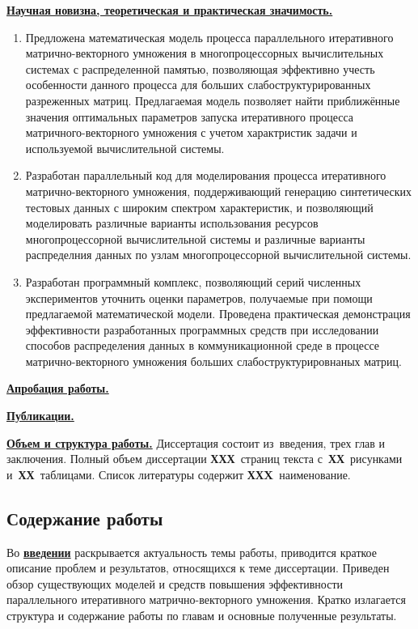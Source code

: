 \underline{\textbf{Научная новизна, теоретическая и практическая значимость.}}
\begin{enumerate}
 \item Предложена математическая модель процесса параллельного итеративного матрично-векторного умножения в
   многопроцессорных вычислительных системах с распределенной памятью, позволяющая эффективно учесть особенности данного
   процесса для больших слабоструктурированных разреженных матриц. Предлагаемая модель позволяет найти приближённые
   значения оптимальных параметров запуска итеративного процесса матричного-векторного умножения с учетом  характристик
   задачи и используемой вычислительной системы.
 \item Разработан параллельный код для моделирования процесса итеративного матрично-векторного умножения, поддерживающий
   генерацию синтетических тестовых данных с широким спектром характеристик, и позволяющий моделировать различные
   варианты использования ресурсов многопроцессорной вычислительной системы и различные варианты распределния данных по
   узлам многопроцессорной вычислительной системы.
 \item Разработан программный комплекс, позволяющий серий численных экспериментов уточнить оценки параметров, получаемые
   при помощи предлагаемой математической модели.  Проведена практическая демонстрация эффективности разработанных
   программных средств при исследовании способов распределения данных в коммуникационной среде в процессе
   матрично-векторного умножения больших слабоструктурировнаных матриц. 
\end{enumerate}

\underline{\textbf{Апробация работы.}}

\underline{\textbf{Публикации.}}

\underline{\textbf{Объем и структура работы.}} Диссертация состоит из~введения, трех глав и заключения. Полный объем диссертации \textbf{ХХХ}~страниц текста с~\textbf{ХХ}~рисунками и~\textbf{ХХ}~таблицами. Список литературы содержит \textbf{ХХX}~наименование.

\subsection*{\Large Содержание работы}
Во \underline{\textbf{введении}} раскрывается актуальность темы работы, приводится краткое описание проблем и
результатов, относящихся к теме диссертации. Приведен обзор существующих моделей и средств повышения эффективности
параллельного итеративного матрично-векторного умножения. Кратко излагается структура и содержание работы по главам и
основные полученные результаты. 

